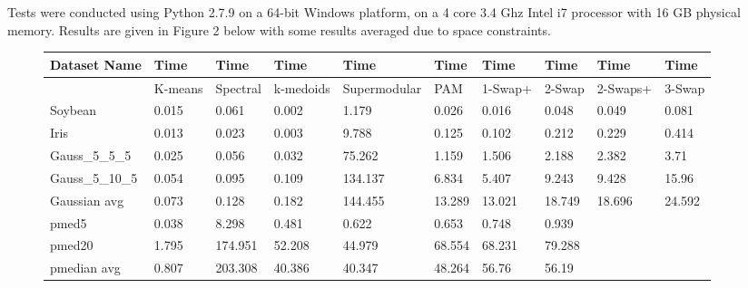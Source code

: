 \documentclass{article}
\begin{document}
Tests were conducted using Python 2.7.9 on a 64-bit Windows platform, on a 4 core 3.4 Ghz Intel i7 processor with 16 GB physical memory. Results are given in Figure 2  below with some results averaged due to space constraints. 

\begin{figure*}[h]
\label{fig:flat_results}
\small
\begin{tabular}{ | l | l | l | l | l | l | l | l | l | l | }
\hline
	Dataset Name & Time & Time & Time & Time & Time & Time & Time & Time & Time \\ \hline
	&K-means & Spectral & k-medoids & Supermodular & PAM & 1-Swap+ & 2-Swap & 2-Swaps+ & 3-Swap  \\ \hline
	Soybean & 0.015 & 0.061 & 0.002 & 1.179 & 0.026 & 0.016 & 0.048 & 0.049 & 0.081 \\ 
	Iris & 0.013 & 0.023 & 0.003 & 9.788 & 0.125 & 0.102 & 0.212 & 0.229 & 0.414 \\ 
	Gauss\_5\_5\_5 & 0.025 & 0.056 & 0.032 & 75.262 & 1.159 & 1.506 & 2.188 & 2.382 & 3.71 \\ 
	Gauss\_5\_10\_5 & 0.054 & 0.095 & 0.109 & 134.137 & 6.834 & 5.407 & 9.243 & 9.428 & 15.96 \\ 
	Gaussian avg & 0.073 & 0.128 & 0.182 & 144.455 & 13.289 & 13.021 & 18.749 & 18.696 & 24.592 \\ 
	pmed5 & 0.038 & 8.298 & 0.481 & 0.622 & 0.653 & 0.748 & 0.939 & \  & \  \\ 
	pmed20 & 1.795 & 174.951 & 52.208 & 44.979 & 68.554 & 68.231 & 79.288 & \  & \  \\ 
	pmedian avg & 0.807 & 203.308 & 40.386 & 40.347 & 48.264 & 56.76 & 56.19 & \  & \  \\ \hline
\end{tabular}
\vspace{0.2 cm}


\end{figure*}
\end{document}
